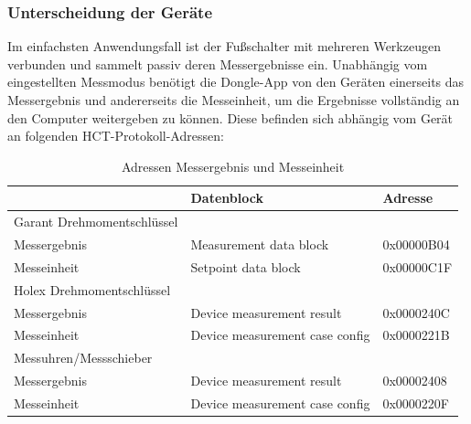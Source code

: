 \subsubsection{Unterscheidung der Geräte}
Im einfachsten Anwendungsfall ist der Fußschalter mit mehreren Werkzeugen verbunden und sammelt passiv deren Messergebnisse ein. Unabhängig vom eingestellten Messmodus benötigt die Dongle-App von den Geräten einerseits das Messergebnis und andererseits die Messeinheit, um die Ergebnisse vollständig an den Computer weitergeben zu können. Diese befinden sich abhängig vom Gerät an folgenden \ac{HCT}-Protokoll-Adressen:

\begin{table}[H]
	\centering
	\begin{tabular}[H]{l|l|l}
		 & Datenblock & Adresse \\
		\hline
		Garant Drehmomentschlüssel & & \\
		Messergebnis & Measurement data block & 0x00000B04 \\
		Messeinheit & Setpoint data block & 0x00000C1F \\
		\hline
		Holex Drehmomentschlüssel & & \\
		Messergebnis & Device measurement result & 0x0000240C \\
		Messeinheit & Device measurement case config & 0x0000221B \\
		\hline
		Messuhren/Messschieber & & \\
		Messergebnis & Device measurement result & 0x00002408 \\
		Messeinheit & Device measurement case config & 0x0000220F \\
	\end{tabular}
	\caption{Adressen Messergebnis und Messeinheit}
\end{table}


